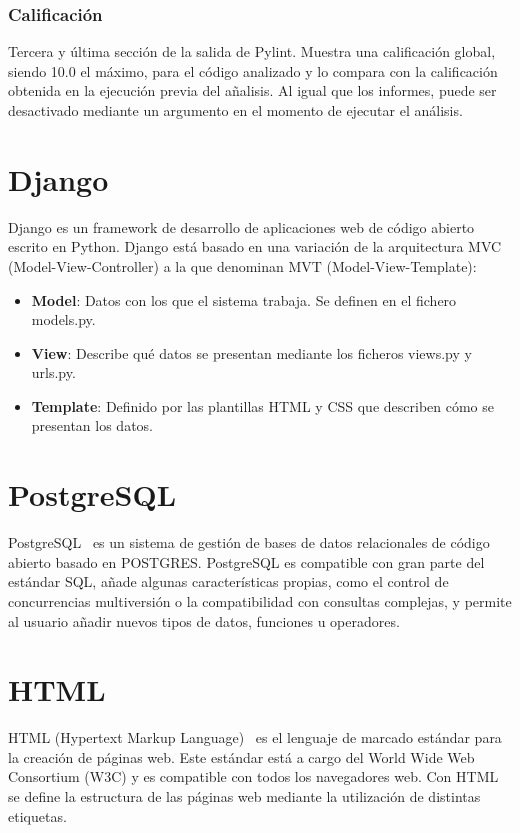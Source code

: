 \documentclass[a4paper, 12pt]{book}
\begin{document}
\subsubsection{Calificación}

Tercera y última sección de la salida de Pylint.
Muestra una calificación global, siendo 10.0 el máximo, para el código analizado y lo compara con la calificación obtenida en la ejecución previa del añalisis.
Al igual que los informes, puede ser desactivado mediante un argumento en el momento de ejecutar el análisis.

\section{Django} 
\label{sec:django}
Django\cite{django} es un framework de desarrollo de aplicaciones web de código abierto escrito en Python. Django está basado en una variación de la arquitectura MVC (Model-View-Controller) a la que denominan MVT (Model-View-Template):
\begin{itemize}
	\item \textbf{Model}: Datos con los que el sistema trabaja. Se definen en el fichero models.py.
	\item \textbf{View}: Describe qué datos se presentan mediante los ficheros views.py y urls.py. 
	\item \textbf{Template}: Definido por las plantillas HTML y CSS que describen cómo se presentan los datos.
\end{itemize}

\section{PostgreSQL} 
\label{sec:postgresql}

PostgreSQL~\cite{postgresql} es un sistema de gestión de bases de datos relacionales de código abierto basado en POSTGRES. PostgreSQL es compatible con gran parte del estándar SQL, añade algunas características propias, como el control de concurrencias multiversión o la compatibilidad con consultas complejas, y permite al usuario añadir nuevos tipos de datos, funciones u operadores.

\section{HTML} 
\label{sec:html}

HTML (Hypertext Markup Language)~\cite{htmlcss} es el lenguaje de marcado estándar para la creación de páginas web. Este estándar está a cargo del World Wide Web Consortium (W3C) y es compatible con todos los navegadores web.
Con HTML se define la estructura de las páginas web mediante la utilización de distintas etiquetas.
\end{document}
